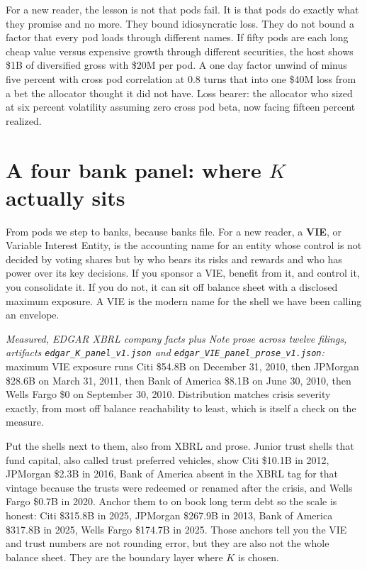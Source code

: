 For a new reader, the lesson is not that pods fail. It is that pods do exactly what they promise and no more. They bound idiosyncratic loss. They do not bound a factor that every pod loads through different names. If fifty pods are each long cheap value versus expensive growth through different securities, the host shows \$1B of diversified gross with \$20M per pod. A one day factor unwind of minus five percent with cross pod correlation at 0.8 turns that into one \$40M loss from a bet the allocator thought it did not have. Loss bearer: the allocator who sized at six percent volatility assuming zero cross pod beta, now facing fifteen percent realized.

\section{A four bank panel: where $K$ actually sits}

From pods we step to banks, because banks file. For a new reader, a \textbf{VIE}, or Variable Interest Entity, is the accounting name for an entity whose control is not decided by voting shares but by who bears its risks and rewards and who has power over its key decisions. If you sponsor a VIE, benefit from it, and control it, you consolidate it. If you do not, it can sit off balance sheet with a disclosed maximum exposure. A VIE is the modern name for the shell we have been calling an envelope.

\textit{Measured, EDGAR XBRL company facts plus Note prose across twelve filings, artifacts \texttt{edgar\_K\_panel\_v1.json} and \texttt{edgar\_VIE\_panel\_prose\_v1.json}:} maximum VIE exposure runs Citi \$54.8B on December 31, 2010, then JPMorgan \$28.6B on March 31, 2011, then Bank of America \$8.1B on June 30, 2010, then Wells Fargo \$0 on September 30, 2010. Distribution matches crisis severity exactly, from most off balance reachability to least, which is itself a check on the measure.

Put the shells next to them, also from XBRL and prose. Junior trust shells that fund capital, also called trust preferred vehicles, show Citi \$10.1B in 2012, JPMorgan \$2.3B in 2016, Bank of America absent in the XBRL tag for that vintage because the trusts were redeemed or renamed after the crisis, and Wells Fargo \$0.7B in 2020. Anchor them to on book long term debt so the scale is honest: Citi \$315.8B in 2025, JPMorgan \$267.9B in 2013, Bank of America \$317.8B in 2025, Wells Fargo \$174.7B in 2025. Those anchors tell you the VIE and trust numbers are not rounding error, but they are also not the whole balance sheet. They are the boundary layer where $K$ is chosen.

